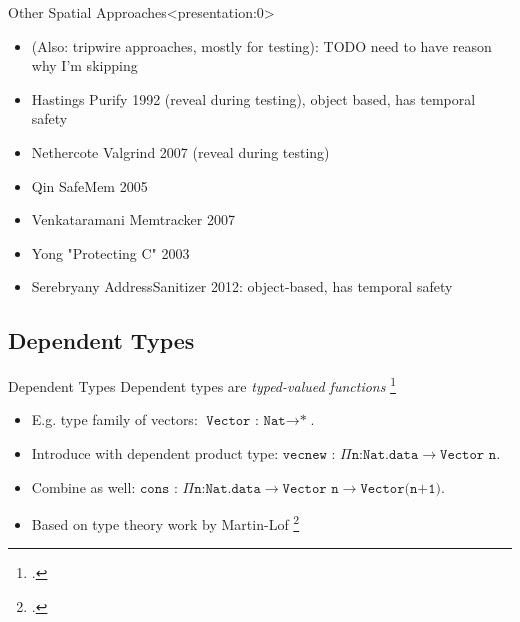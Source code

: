 \documentclass[aspectratio=169]{beamer}
\begin{document}
\begin{frame}{Other Spatial Approaches}<presentation:0>
\begin{itemize}
 \item (Also: tripwire approaches, mostly for testing): TODO need to have reason why I'm skipping
 \item Hastings Purify 1992 (reveal during testing), object based, has temporal safety
 \item Nethercote Valgrind 2007 (reveal during testing)
 \item Qin SafeMem 2005
 \item Venkataramani Memtracker 2007
 \item Yong "Protecting C" 2003
 \item Serebryany AddressSanitizer 2012: object-based, has temporal safety
\end{itemize}
\end{frame}

\subsection{Dependent Types}

\begin{frame}{Dependent Types}
    Dependent types are \emph{typed-valued functions} \footcite{pierce_advanced_2005}
    \begin{itemize}
        \item E.g. type family of vectors: $\texttt{Vector : Nat}\rightarrow\texttt{*}$.
        \item Introduce with \alert{dependent product type}: $\texttt{vecnew : }\Pi\texttt{n:Nat.data}\rightarrow\texttt{Vector n}$.
        \item Combine as well: $\texttt{cons : }\Pi\texttt{n:Nat.data}\rightarrow\texttt{Vector n}\rightarrow\texttt{Vector(n+1)}$.
        \item Based on type theory work by Martin-L\:of \footcite{martin-lof_constructive_1984}
    \end{itemize}
\end{frame}
\end{document}
